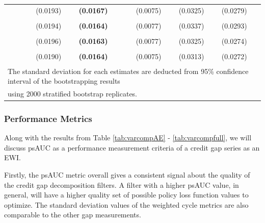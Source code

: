 \documentclass[
  12pt,
]{article}
\begin{document}
\begin{table}[H]
{\begin{tabular}[t]{llll>{}lllll}
 &  &  & (0.0193) & \textbf{(0.0167)} &  & (0.0075) & (0.0325) & (0.0279)\\
\addlinespace
\cellcolor{gray!6}{c.hp125k} & \cellcolor{gray!6}{-92.2897} & \cellcolor{gray!6}{-98.6725} & \cellcolor{gray!6}{0.6562} & \textbf{\cellcolor{gray!6}{0.5924}} & \cellcolor{gray!6}{2.5216} & \cellcolor{gray!6}{0.4547} & \cellcolor{gray!6}{0.3302} & \cellcolor{gray!6}{0.3158}\\
 &  &  & (0.0194) & \textbf{(0.0164)} &  & (0.0077) & (0.0337) & (0.0293)\\
\addlinespace
\cellcolor{gray!6}{c.hp221k} & \cellcolor{gray!6}{-106.8842} & \cellcolor{gray!6}{-113.2670} & \cellcolor{gray!6}{0.6656} & \textbf{\cellcolor{gray!6}{0.5921}} & \cellcolor{gray!6}{2.6641} & \cellcolor{gray!6}{0.4561} & \cellcolor{gray!6}{0.3160} & \cellcolor{gray!6}{0.3079}\\
 &  &  & (0.0196) & \textbf{(0.0163)} &  & (0.0077) & (0.0325) & (0.0274)\\
\addlinespace
\cellcolor{gray!6}{c.hp400k.r15} & \cellcolor{gray!6}{-67.1228} & \cellcolor{gray!6}{-73.5055} & \cellcolor{gray!6}{0.6472} & \textbf{\cellcolor{gray!6}{0.5912}} & \cellcolor{gray!6}{2.6223} & \cellcolor{gray!6}{0.4592} & \cellcolor{gray!6}{0.3255} & \cellcolor{gray!6}{0.3168}\\
 &  &  & (0.0190) & \textbf{(0.0164)} &  & (0.0075) & (0.0313) & (0.0272)\\
\bottomrule
\multicolumn{9}{l}{\textsuperscript{} The standard deviation for each estimates are deducted from 95\% confidence interval of the bootstrapping results}\\
\multicolumn{9}{l}{using 2000 stratified bootstrap replicates.}\\
\end{tabular}}
\end{table}

\hypertarget{performance-metrics}{%
\subsubsection{Performance Metrics}\label{performance-metrics}}

Along with the results from Table \ref{tab:varcompAE} - \ref{tab:varcompfull}, we will discuss psAUC as a performance measurement criteria of a credit gap series as an EWI.

Firstly, the psAUC metric overall gives a consistent signal about the quality of the credit gap decomposition filters. A filter with a higher psAUC value, in general, will have a higher quality set of possible policy loss function values to optimize. The standard deviation values of the weighted cycle metrics are also comparable to the other gap measurements.
\end{document}
